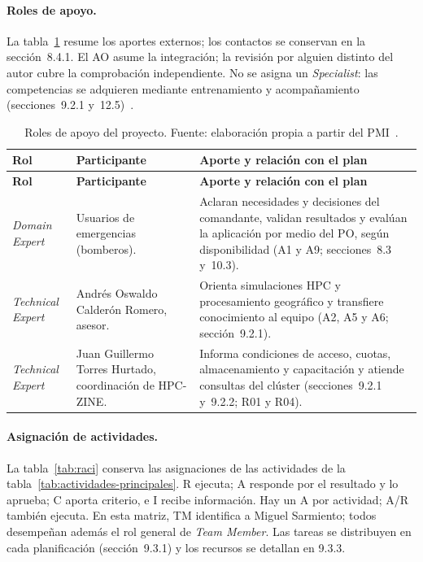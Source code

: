 \paragraph{Roles de apoyo.} La tabla~\ref{tab:roles-apoyo} resume los aportes externos; los contactos se conservan en la sección~8.4.1. El AO asume la integración; la revisión por alguien distinto del autor cubre la comprobación independiente. No se asigna un \textit{Specialist}: las competencias se adquieren mediante entrenamiento y acompañamiento (secciones~9.2.1 y~12.5)~\cite{pmiDADroles}.

\begin{longtable}{|p{}|p{}|p{}|}
\caption{Roles de apoyo del proyecto. Fuente: elaboración propia a partir del PMI~\cite{pmiDADroles}.}\label{tab:roles-apoyo}\\\hline
\textbf{Rol} & \textbf{Participante} & \textbf{Aporte y relación con el plan}\tabularnewline\hline
\endfirsthead
\hline
\textbf{Rol} & \textbf{Participante} & \textbf{Aporte y relación con el plan}\tabularnewline\hline
\endhead
\raggedright \textit{Domain Expert} & \raggedright Usuarios de emergencias (bomberos). & \raggedright Aclaran necesidades y decisiones del comandante, validan resultados y evalúan la aplicación por medio del PO, según disponibilidad (A1 y A9; secciones~8.3 y~10.3).\tabularnewline\hline
\raggedright \textit{Technical Expert} & \raggedright Andrés Oswaldo Calderón Romero, asesor. & \raggedright Orienta simulaciones HPC y procesamiento geográfico y transfiere conocimiento al equipo (A2, A5 y A6; sección~9.2.1).\tabularnewline\hline
\raggedright \textit{Technical Expert} & \raggedright Juan Guillermo Torres Hurtado, coordinación de HPC-ZINE. & \raggedright Informa condiciones de acceso, cuotas, almacenamiento y capacitación y atiende consultas del clúster (secciones~9.2.1 y~9.2.2; R01 y R04).\tabularnewline\hline
\end{longtable}

\paragraph{Asignación de actividades.} La tabla~\ref{tab:raci} conserva las asignaciones de las actividades de la tabla~\ref{tab:actividades-principales}. R ejecuta; A responde por el resultado y lo aprueba; C aporta criterio, e I recibe información. Hay un A por actividad; A/R también ejecuta. En esta matriz, TM identifica a Miguel Sarmiento; todos desempeñan además el rol general de \textit{Team Member}. Las tareas se distribuyen en cada planificación (sección~9.3.1) y los recursos se detallan en 9.3.3.

